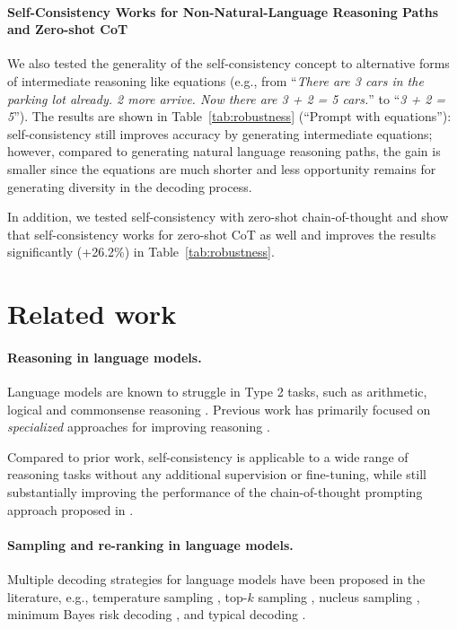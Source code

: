 \paragraph{Self-Consistency Works for Non-Natural-Language Reasoning Paths and Zero-shot CoT} We also tested the generality of the self-consistency concept to alternative forms of intermediate reasoning like equations (e.g., from ``\textit{There are 3 cars in the parking lot already. 2 more arrive. Now there are 3 + 2 = 5 cars.}'' to ``\textit{3 + 2 = 5}''). The results are shown in Table~\ref{tab:robustness} (``Prompt with equations''): self-consistency still improves accuracy by generating intermediate equations; however, compared to generating natural language reasoning paths, the gain is smaller since the equations are much shorter and less opportunity remains for generating diversity in the decoding process.

In addition, we tested self-consistency with zero-shot chain-of-thought \citep{zero_shot_cot} and show that self-consistency works for zero-shot CoT as well and improves the results  significantly (+26.2\%) in Table~\ref{tab:robustness}.

\section{Related work}
\paragraph{Reasoning in language models.} Language models are known to struggle in Type 2 tasks, such as arithmetic, logical and commonsense reasoning \citep{evans2010intuition}. Previous work has primarily focused on \textit{specialized} approaches for improving reasoning \citep{andor-etal-2019-giving,ran-etal-2019-numnet,geva-etal-2020-injecting,piekos-etal-2021-measuring}.

Compared to prior work, self-consistency is applicable to a wide range of reasoning tasks without any additional supervision or fine-tuning,  while still substantially improving the performance of the chain-of-thought prompting approach proposed in \citet{wei2022chain}.

\paragraph{Sampling and re-ranking in language models.}

Multiple decoding strategies for language models have been proposed in the literature, e.g., temperature sampling \citep{ACKLEY1985147,ficler-goldberg-2017-controlling}, top-$k$ sampling \citep{fan-etal-2018-hierarchical,holtzman-etal-2018-learning,Radford2019LanguageMA}, nucleus sampling \citep{nucleus_sampling}, minimum Bayes risk decoding \citep{eikema-aziz-2020-map,shi-etal-2022-natural}, and typical decoding \citep{meister2022typical}.

